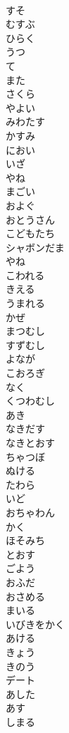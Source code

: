 \documentclass[8pt]{extreport}
\begin{document}
\begin{CJK}{UTF8}{min}
\\	すそ
\\	むすぶ
\\	ひらく
\\	うつ
\\	て
\\	また
\\	さくら
\\	やよい
\\	みわたす
\\	かすみ
\\	におい
\\	いざ
\\	やね
\\	まごい
\\	およぐ
\\	おとうさん
\\	こどもたち
\\	シャボンだま
\\	やね
\\	こわれる
\\	きえる
\\	うまれる
\\	かぜ
\\	まつむし
\\	すずむし
\\	よなが
\\	こおろぎ
\\	なく
\\	くつわむし
\\	あき
\\	なきだす
\\	なきとおす
\\	ちゃつぼ
\\	ぬける
\\	たわら
\\	いど
\\	おちゃわん
\\	かく
\\	ほそみち
\\	とおす
\\	ごよう
\\	おふだ
\\	おさめる
\\	まいる
\\	いびきをかく
\\	あける
\\	きょう
\\	きのう
\\	デート
\\	あした 
\\	あす
\\	しまる

\end{CJK}
\end{document}
